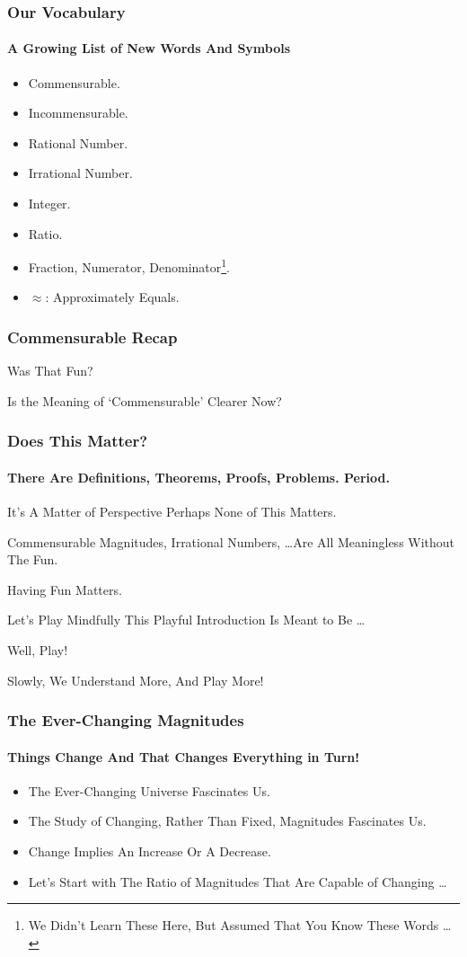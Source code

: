 \documentclass{beamer}
\begin{document}
\begin{frame}
\frametitle{Our Vocabulary}
\framesubtitle{A Growing List of New Words And Symbols}
\label{slide:vocab}
\begin{itemize}
\pause
\item Commensurable.
\pause
\item Incommensurable.
\pause
\item Rational Number.
\pause
\item Irrational Number.
\pause
\item Integer.
\pause
\item Ratio.
\pause
\item Fraction, Numerator, Denominator\footnote{We Didn't Learn These Here, But Assumed That You Know These Words \dots}.
\pause
\item $\approx$: Approximately Equals.
\end{itemize}
\end{frame}




\begin{frame}
\frametitle{Commensurable Recap}

Was That Fun?
\pause

Is the Meaning of `Commensurable' Clearer Now?
\end{frame}

\begin{frame}
\frametitle{Does This Matter?}
\framesubtitle{There Are Definitions, Theorems, Proofs, Problems. Period.}
\label{slide:doesitmatter}
\begin{block}{It's A Matter of Perspective}
Perhaps None of This Matters.

Commensurable Magnitudes, Irrational Numbers, \dots Are All Meaningless Without The Fun.

Having Fun Matters.
\end{block}
\pause
\begin{block}{Let's Play Mindfully}
This Playful Introduction Is Meant to Be \dots
\pause

Well, Play!
\pause

Slowly, We Understand More, \pause And Play More!
\end{block}
\end{frame}

\begin{frame}
\frametitle{The Ever-Changing Magnitudes}
\framesubtitle{Things Change And That Changes Everything in Turn!}
\label{slide:changingmagnitudes}
\begin{itemize}
\item The Ever-Changing Universe Fascinates Us.
\pause
\item The Study of Changing, Rather Than Fixed, Magnitudes Fascinates Us.
\pause
\item Change Implies An Increase Or A Decrease.
\pause
\item Let's Start with The Ratio of Magnitudes That Are Capable of Changing \dots
\end{itemize}
\end{frame}
\end{document}
